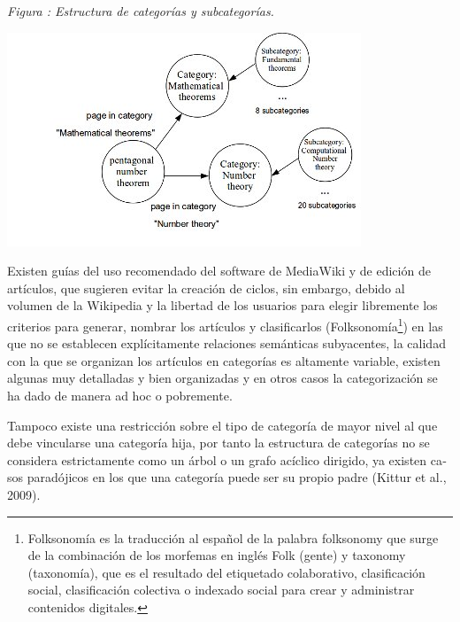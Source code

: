\documentclass[letterpaper]{article}
\newcommand\textstylebibuscitbase[1]{#1}
\newcounter{Figura}
\renewcommand\theFigura{\arabic{Figura}}
\begin{document}
\begin{center}
\begin{minipage}{10.583cm}
{\centering{}\itshape
Figura {\theFigura\label{seq:refFigura1}}:
Estructura de categor\'ias y subcategor\'ias.
\par}
\includegraphics[width=10.583cm,height=6.376cm]{Capitulo2-img5.jpg}\end{minipage}
\end{center}
{\sffamily
Existen gu\'ias del uso recomendado del software de MediaWiki y de
edici\'on de art\'iculos, que sugieren evitar la creaci\'on de ciclos,
sin embargo, debido al volumen de la Wikipedia y la libertad de los
usuarios para elegir libremente los criterios para generar, nombrar los
art\'iculos y clasificarlos (Folksonom\'ia\footnote{Folksonom\'ia es la
traducci\'on al espa\~nol de la palabra folksonomy que surge de la
combinaci\'on de los morfemas en ingl\'es Folk (gente) y taxonomy
(taxonom\'ia), que es el resultado del etiquetado colaborativo,
clasificaci\'on social, clasificaci\'on colectiva o indexado social
para crear y administrar contenidos digitales.}) en las que no se
establecen expl\'icitamente relaciones sem\'anticas subyacentes, la
calidad con la que se organizan los art\'iculos en categor\'ias es
altamente variable, existen algunas muy detalladas y bien organizadas y
en otros casos la categorizaci\'on se ha dado de manera ad hoc o
pobremente.}


\bigskip

{\sffamily
\textstylebibuscitbase{\foreignlanguage{spanish}{Tampoco existe una
restricci\'on sobre el tipo de categor\'ia de mayor nivel al que debe
vincularse una categor\'ia hija, por tanto la estructura de
categor\'ias no se considera estrictamente
como}}\textstylebibuscitbase{\foreignlanguage{spanish}{ un
\'arbol}}\textstylebibuscitbase{\foreignlanguage{spanish}{ o un grafo
ac\'iclico dirigido, ya existen casos parad\'ojicos en los que una
categor\'ia puede ser su propio padre
}}\textstylebibuscitbase{\foreignlanguage{spanish}{(Kittur et al.,
2009)}}\textstylebibuscitbase{\foreignlanguage{spanish}{.}}}
\end{document}
